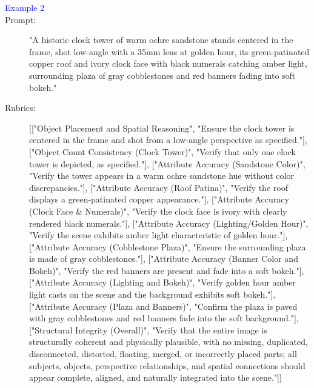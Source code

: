 \begin{tcolorbox}
\begin{description}
\item[\textcolor{blue}{Example 2}]
\item[Prompt:] "A historic clock tower of warm ochre sandstone stands centered in the frame, shot low-angle with a 35mm lens at golden hour, its green-patinated copper roof and ivory clock face with black numerals catching amber light, surrounding plaza of gray cobblestones and red banners fading into soft bokeh."
\item[Rubrics:] [["Object Placement and Spatial Reasoning", "Ensure the clock tower is centered in the frame and shot from a low-angle perspective as specified."], ["Object Count Consistency (Clock Tower)", "Verify that only one clock tower is depicted, as specified."], ["Attribute Accuracy (Sandstone Color)", "Verify the tower appears in a warm ochre sandstone hue without color discrepancies."], ["Attribute Accuracy (Roof Patina)", "Verify the roof displays a green-patinated copper appearance."], ["Attribute Accuracy (Clock Face \& Numerals)", "Verify the clock face is ivory with clearly rendered black numerals."], ["Attribute Accuracy (Lighting/Golden Hour)", "Verify the scene exhibits amber light characteristic of golden hour."], ["Attribute Accuracy (Cobblestone Plaza)", "Ensure the surrounding plaza is made of gray cobblestones."], ["Attribute Accuracy (Banner Color and Bokeh)", "Verify the red banners are present and fade into a soft bokeh."], ["Attribute Accuracy (Lighting and Bokeh)", "Verify golden hour amber light casts on the scene and the background exhibits soft bokeh."], ["Attribute Accuracy (Plaza and Banners)", "Confirm the plaza is paved with gray cobblestones and red banners fade into the soft background."], ["Structural Integrity (Overall)", "Verify that the entire image is structurally coherent and physically plausible, with no missing, duplicated, disconnected, distorted, floating, merged, or incorrectly placed parts; all subjects, objects, perspective relationships, and spatial connections should appear complete, aligned, and naturally integrated into the scene."]]



\end{description}
\end{tcolorbox}
